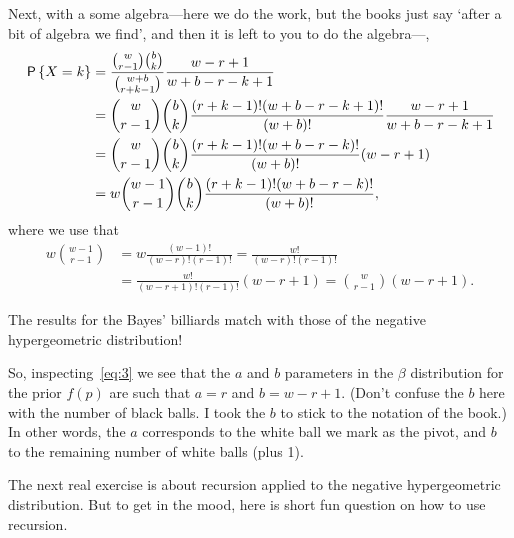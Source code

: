 \documentclass[lectures]{subfiles}
\begin{document}
\begin{exercise}
\begin{solution}
Next, with a some algebra---here we do the work, but the books just say `after a bit of algebra we find', and then it is left to you to do the algebra---,
\begin{align}
\label{eq:17}
\P{X=k}
&= \frac{{w \choose r-1}{b \choose k}}{{w+b \choose r+k -1}}\frac{w-r+1}{w+b-r-k+1} \\
&= {w \choose r-1}{b \choose k} \frac{(r+k-1)!(w+b-r-k+1)!}{(w+b)!}\frac{w-r+1}{w+b-r-k+1} \\
&= {w \choose r-1}{b \choose k} \frac{(r+k-1)!(w+b-r-k)!}{(w+b)!}(w-r+1) \\
&= w {w -1 \choose r-1}{b \choose k} \frac{(r+k-1)!(w+b-r-k)!}{(w+b)!},
\end{align}
where we use that
\begin{align}
  w{w-1 \choose r-1} &= w\frac{ (w-1)!}{(w-r)! (r-1)!} = \frac{ w!}{(w-r)! (r-1)!} \\
&=\frac{ w!}{(w-r+1)! (r-1)!} (w-r+1)= {w\choose r-1} (w-r+1).
\end{align}

The results for the Bayes' billiards match with those of the negative hypergeometric distribution!

So, inspecting~\cref{eq:3} we see that the $a$ and $b$ parameters in the $\beta$ distribution for the prior $f(p)$ are such that $a=r$ and $b=w-r+1$.
(Don't confuse the $b$ here with the number of black balls.
I took the $b$ to stick to the notation of the book.)
In other words, the $a$ corresponds to the white ball we mark as the pivot, and $b$ to the remaining number of white balls (plus 1).
\end{solution}
\end{exercise}

The next real exercise is about recursion applied to the negative hypergeometric distribution. But to get in the mood, here is short fun question on how to use recursion.
\end{document}
